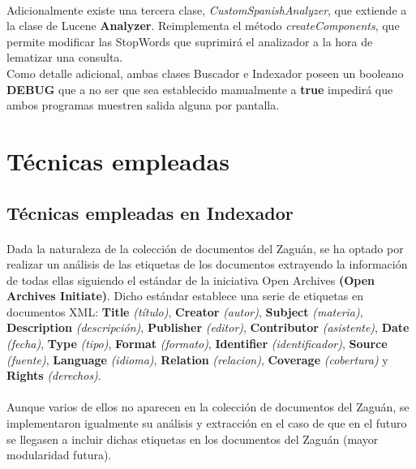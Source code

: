 \documentclass[a4paper]{article}
\begin{document}
\paragraph{}Adicionalmente existe una tercera clase, \textit{CustomSpanishAnalyzer}, que extiende a la clase de Lucene \textbf{Analyzer}. Reimplementa el método \textit{createComponents}, que permite modificar las StopWords que suprimirá el analizador a la hora de lematizar una consulta.
\\
\newline Como detalle adicional, ambas clases Buscador e Indexador poseen un booleano \textbf{DEBUG} que a no ser que sea establecido manualmente a \textbf{true} impedirá que ambos programas muestren salida alguna por pantalla.

\section{Técnicas empleadas}
\subsection{Técnicas empleadas en Indexador}
\paragraph{}Dada la naturaleza de la colección de documentos del Zaguán, se ha optado por realizar un análisis de las etiquetas de los documentos extrayendo la información de todas ellas siguiendo el estándar de la iniciativa Open Archives \textbf{(Open Archives Initiate)}. Dicho estándar establece una serie de etiquetas en documentos XML: \textbf{Title} \textit{(título)}, \textbf{Creator} \textit{(autor)}, \textbf{Subject} \textit{(materia)}, \textbf{Description} \textit{(descripción)}, \textbf{Publisher} \textit{(editor)}, \textbf{Contributor} \textit{(asistente)}, \textbf{Date} \textit{(fecha)},
\textbf{Type} \textit{(tipo)}, \textbf{Format} \textit{(formato)}, \textbf{Identifier} \textit{(identificador)}, \textbf{Source} \textit{(fuente)}, \textbf{Language} \textit{(idioma)}, \textbf{Relation} \textit{(relacion)}, \textbf{Coverage} \textit{(cobertura)} y \textbf{Rights} \textit{(derechos)}.
\paragraph{}Aunque varios de ellos no aparecen en la colección de documentos del Zaguán, se implementaron igualmente su análisis y extracción en el caso de que en el futuro se llegasen a incluir dichas etiquetas en los documentos del Zaguán (mayor modularidad futura).
\end{document}
